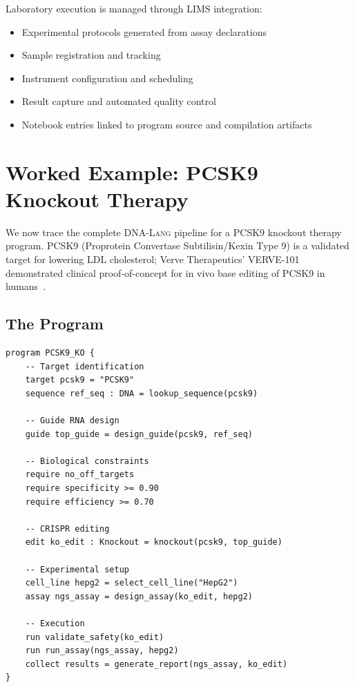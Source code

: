 \documentclass[12pt,a4paper]{article}
\newcommand{\DNALang}{\textsc{DNA-Lang}}
\begin{document}
Laboratory execution is managed through LIMS integration:
\begin{itemize}
    \item Experimental protocols generated from assay declarations
    \item Sample registration and tracking
    \item Instrument configuration and scheduling
    \item Result capture and automated quality control
    \item Notebook entries linked to program source and compilation artifacts
\end{itemize}


\section{Worked Example: PCSK9 Knockout Therapy}
\label{sec:example}

We now trace the complete \DNALang{} pipeline for a PCSK9 knockout therapy program. PCSK9 (Proprotein Convertase Subtilisin/Kexin Type 9) is a validated target for lowering LDL cholesterol; Verve Therapeutics' VERVE-101 demonstrated clinical proof-of-concept for in vivo base editing of PCSK9 in humans~\cite{verve2023}.

\subsection{The Program}

\begin{lstlisting}[style=dnalangstyle,caption={PCSK9 knockout therapy program in \DNALang{}.},label={lst:pcsk9}]
program PCSK9_KO {
    -- Target identification
    target pcsk9 = "PCSK9"
    sequence ref_seq : DNA = lookup_sequence(pcsk9)

    -- Guide RNA design
    guide top_guide = design_guide(pcsk9, ref_seq)

    -- Biological constraints
    require no_off_targets
    require specificity >= 0.90
    require efficiency >= 0.70

    -- CRISPR editing
    edit ko_edit : Knockout = knockout(pcsk9, top_guide)

    -- Experimental setup
    cell_line hepg2 = select_cell_line("HepG2")
    assay ngs_assay = design_assay(ko_edit, hepg2)

    -- Execution
    run validate_safety(ko_edit)
    run run_assay(ngs_assay, hepg2)
    collect results = generate_report(ngs_assay, ko_edit)
}
\end{lstlisting}
\end{document}
